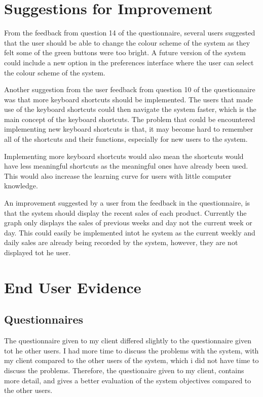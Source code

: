 \pagebreak
\section{Suggestions for Improvement}

From the feedback from question 14 of the questionnaire, several users suggested that the user should be able to change the colour scheme of the system as they felt some of the green buttons were too bright. A future version of the system could include a new option in the preferences interface where the user can select the colour scheme of the system. 

Another suggestion from the user feedback from question 10 of the questionnaire was that more keyboard shortcuts should be implemented. The users that made use of the keyboard shortcuts could then navigate the system faster, which is the main concept of the keyboard shortcuts. The problem that could be encountered implementing new keyboard shortcuts is that, it may become hard to remember all of the shortcuts and their functions, especially for new users to the system.

Implementing more keyboard shortcuts would also mean the shortcuts would have less meaningful shortcuts as the meaningful ones have already been used. This would also increase the learning curve for users with little computer knowledge.

An improvement suggested by a user from the feedback in the questionnaire, is that the system should display the recent sales of each product. Currently the graph only displays the sales of previous weeks and day not the current week or day. This could easily be implemented intot he system as the current weekly and daily sales are already being recorded by the system, however, they are not displayed tot he user.

\pagebreak
\section{End User Evidence}

\pagebreak
\subsection{Questionnaires}

The questionnaire given to my client differed slightly to the questionnaire given tot he other users. I had more time to discuss the problems with the system, with my client compared to the other users of the system, which i did not have time to discuss the problems. Therefore, the questionaire given to my client, contains more detail, and gives a better evaluation of the system objectives compared to the other users.

